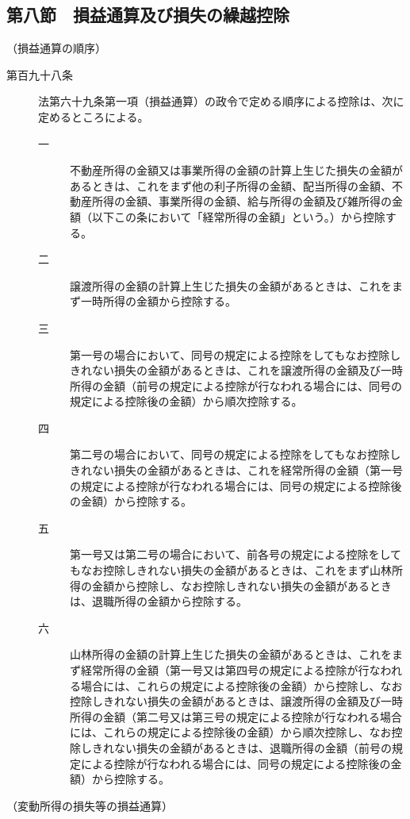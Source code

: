 \documentclass[twocolumn,a4j,10pt]{ltjtarticle}
\begin{document}
\subsection*{第八節　損益通算及び損失の繰越控除}
\noindent\hspace{10pt}（損益通算の順序）
\begin{description}
\item[第百九十八条]法第六十九条第一項（損益通算）の政令で定める順序による控除は、次に定めるところによる。
\begin{description}
\item[一]不動産所得の金額又は事業所得の金額の計算上生じた損失の金額があるときは、これをまず他の利子所得の金額、配当所得の金額、不動産所得の金額、事業所得の金額、給与所得の金額及び雑所得の金額（以下この条において「経常所得の金額」という。）から控除する。
\item[二]譲渡所得の金額の計算上生じた損失の金額があるときは、これをまず一時所得の金額から控除する。
\item[三]第一号の場合において、同号の規定による控除をしてもなお控除しきれない損失の金額があるときは、これを譲渡所得の金額及び一時所得の金額（前号の規定による控除が行なわれる場合には、同号の規定による控除後の金額）から順次控除する。
\item[四]第二号の場合において、同号の規定による控除をしてもなお控除しきれない損失の金額があるときは、これを経常所得の金額（第一号の規定による控除が行なわれる場合には、同号の規定による控除後の金額）から控除する。
\item[五]第一号又は第二号の場合において、前各号の規定による控除をしてもなお控除しきれない損失の金額があるときは、これをまず山林所得の金額から控除し、なお控除しきれない損失の金額があるときは、退職所得の金額から控除する。
\item[六]山林所得の金額の計算上生じた損失の金額があるときは、これをまず経常所得の金額（第一号又は第四号の規定による控除が行なわれる場合には、これらの規定による控除後の金額）から控除し、なお控除しきれない損失の金額があるときは、譲渡所得の金額及び一時所得の金額（第二号又は第三号の規定による控除が行なわれる場合には、これらの規定による控除後の金額）から順次控除し、なお控除しきれない損失の金額があるときは、退職所得の金額（前号の規定による控除が行なわれる場合には、同号の規定による控除後の金額）から控除する。
\end{description}
\end{description}
\noindent\hspace{10pt}（変動所得の損失等の損益通算）
\end{document}
